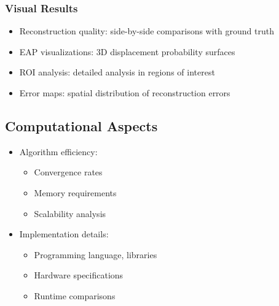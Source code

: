 \documentclass[journal,twoside,web]{ieeecolor}
\begin{document}
\subsubsection{Visual Results}
\begin{itemize}
    \item Reconstruction quality: side-by-side comparisons with ground truth
    \item EAP visualizations: 3D displacement probability surfaces
    \item ROI analysis: detailed analysis in regions of interest
    \item Error maps: spatial distribution of reconstruction errors
\end{itemize}

\subsection{Computational Aspects}
\begin{itemize}
    \item Algorithm efficiency:
    \begin{itemize}
        \item Convergence rates
        \item Memory requirements
        \item Scalability analysis
    \end{itemize}
    \item Implementation details:
    \begin{itemize}
        \item Programming language, libraries
        \item Hardware specifications
        \item Runtime comparisons
    \end{itemize}
\end{itemize}
\end{document}
